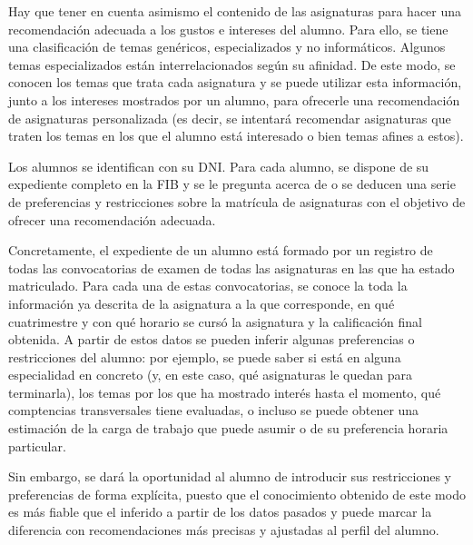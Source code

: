 Hay que tener en cuenta asimismo el contenido de las asignaturas para hacer 
una recomendación adecuada a los gustos e intereses del alumno. Para ello, 
se tiene una clasificación de temas genéricos, especializados y no 
informáticos. Algunos temas especializados están interrelacionados según su 
afinidad. De este modo, se conocen los temas que trata cada asignatura y se 
puede utilizar esta información, junto a los intereses mostrados por un 
alumno, para ofrecerle una recomendación de asignaturas personalizada (es 
decir, se intentará recomendar asignaturas que traten los temas en los que 
el alumno está interesado o bien temas afines a estos). 

Los alumnos se identifican con su DNI. Para cada alumno, se dispone de su 
expediente completo en la FIB y se le pregunta acerca de o se deducen una 
serie de preferencias y restricciones sobre la matrícula de asignaturas con 
el objetivo de ofrecer una recomendación adecuada.

Concretamente, el expediente de un alumno está formado por un registro de 
todas las convocatorias de examen de todas las asignaturas en las que ha 
estado matriculado. Para cada una de estas convocatorias, se conoce la 
toda la información ya descrita de la asignatura a la que corresponde, en qué 
cuatrimestre y con qué horario se cursó la asignatura y la calificación final 
obtenida. A partir de estos datos se pueden inferir algunas preferencias o 
restricciones del alumno: por ejemplo, se puede saber si está en alguna 
especialidad en concreto (y, en este caso, qué asignaturas le quedan para 
terminarla), los temas por los que ha mostrado interés hasta el momento, qué 
comptencias transversales tiene evaluadas, o incluso se puede obtener una 
estimación de la carga de trabajo que puede asumir o de su preferencia horaria 
particular.

Sin embargo, se dará la oportunidad al alumno de introducir sus restricciones 
y preferencias de forma explícita, puesto que el conocimiento obtenido de este 
modo es más fiable que el inferido a partir de los datos pasados y puede 
marcar la diferencia con recomendaciones más precisas y ajustadas al perfil 
del alumno. 

